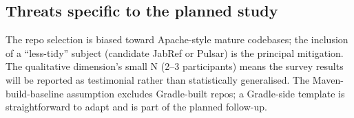 \subsection{Threats specific to the planned study}

The repo selection is biased toward Apache-style mature codebases; the inclusion of a ``less-tidy'' subject (candidate JabRef or Pulsar) is the principal mitigation. The qualitative dimension's small N (2--3 participants) means the survey results will be reported as testimonial rather than statistically generalised. The Maven-build-baseline assumption excludes Gradle-built repos; a Gradle-side template is straightforward to adapt and is part of the planned follow-up.
